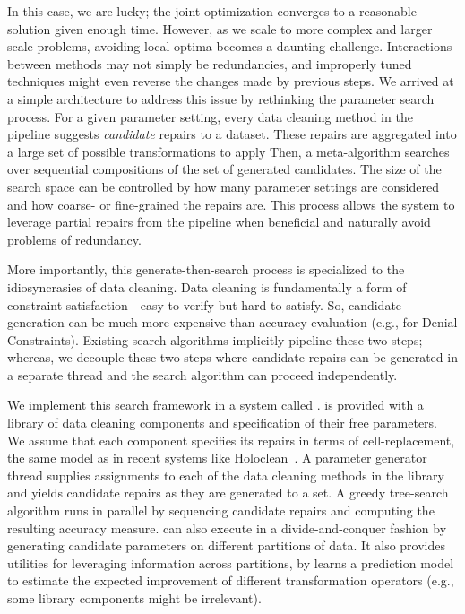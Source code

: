 In this case, we are lucky; the joint optimization converges to a reasonable solution given enough time.
However, as we scale to more complex and larger scale problems, avoiding local optima becomes a daunting challenge.
Interactions between methods may not simply be redundancies, and improperly tuned techniques might even reverse the changes made by previous steps.
We arrived at a simple architecture to address this issue by rethinking the parameter search process.
For a given parameter setting, every data cleaning method in the pipeline suggests \emph{candidate} repairs to a dataset.
These repairs are aggregated into a large set of possible transformations to apply
Then, a meta-algorithm searches over sequential compositions of the set of generated candidates.
The size of the search space can be controlled by how many parameter settings are considered and how coarse- or fine-grained the repairs are.
This process allows the system to leverage partial repairs from the pipeline when beneficial and naturally avoid problems of redundancy.

More importantly, this generate-then-search process is specialized to the idiosyncrasies of data cleaning.
Data cleaning is fundamentally a form of constraint satisfaction---easy to verify but hard to satisfy.
So, candidate generation can be much more expensive than accuracy evaluation (e.g., for Denial Constraints).
Existing search algorithms implicitly pipeline these two steps; whereas, we decouple these two steps where candidate repairs can be generated in a separate thread and the search algorithm can proceed independently.

We implement this search framework in a system called \sys.
\sys is provided with a library of data cleaning components and specification of their free parameters. 
We assume that each component specifies its repairs in terms of cell-replacement, the same model as in recent systems like Holoclean~\cite{rekatsinas2017holoclean}.
A parameter generator thread supplies assignments to each of the data cleaning methods in the library and yields candidate repairs as they are generated to a set.
A greedy tree-search algorithm runs in parallel by sequencing candidate repairs and computing the resulting accuracy measure.
\sys can also execute in a divide-and-conquer fashion by generating candidate parameters on different partitions of data.
It also provides utilities for leveraging information across partitions, by learns a prediction model to estimate the expected improvement of different transformation operators (e.g., some library components might be irrelevant).  

